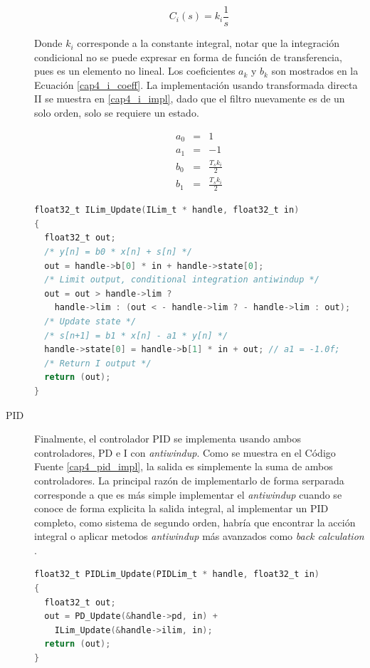 \begin{description}
\begin{equation}\label{cap4_i}
C_{i}(s)=k_i \frac{1}{s}
\end{equation}

Donde $k_i$ corresponde a la constante integral, notar que la integración condicional no se puede expresar en forma de función de transferencia, pues es un elemento no lineal. Los coeficientes $a_k$ y $b_k$ son mostrados en la Ecuación \ref{cap4_i_coeff}. La implementación usando transformada directa II se muestra en \ref{cap4_i_impl}, dado que el filtro nuevamente es de un solo orden, solo se requiere un estado.

\begin{eqnarray}\label{cap4_i_coeff}
a_0 &=& 1\\
a_1 &=& -1\\
b_0 &=& \frac{T_s k_i}{2}\\
b_1 &=& \frac{T_s k_i}{2}
\end{eqnarray}

\begin{lstlisting}[language=C,style=csstyle, caption=Implementación \texttt{ILim\_Update}, label=cap4_i_impl]
float32_t ILim_Update(ILim_t * handle, float32_t in)
{
  float32_t out;
  /* y[n] = b0 * x[n] + s[n] */
  out = handle->b[0] * in + handle->state[0];
  /* Limit output, conditional integration antiwindup */
  out = out > handle->lim ?  
    handle->lim : (out < - handle->lim ? - handle->lim : out);
  /* Update state */
  /* s[n+1] = b1 * x[n] - a1 * y[n] */
  handle->state[0] = handle->b[1] * in + out; // a1 = -1.0f;
  /* Return I output */
  return (out);
}
\end{lstlisting}

\item[PID] Finalmente, el controlador PID se implementa usando ambos controladores, PD e I con \textit{antiwindup}. Como se muestra en el Código Fuente \ref{cap4_pid_impl}, la salida es simplemente la suma de ambos controladores. La principal razón de implementarlo de forma serparada corresponde a que es más simple implementar el \textit{antiwindup} cuando se conoce de forma explicita la salida integral, al implementar un PID completo, como sistema de segundo orden, habría que encontrar la acción integral o aplicar metodos \textit{antiwindup} más avanzados como \textit{back calculation} \cite{practical_pid}.

\begin{lstlisting}[language=C,style=csstyle, caption=Implementación \texttt{PIDLim\_Update}, label=cap4_pid_impl]
float32_t PIDLim_Update(PIDLim_t * handle, float32_t in)
{
  float32_t out;
  out = PD_Update(&handle->pd, in) + 
    ILim_Update(&handle->ilim, in);
  return (out);
}
\end{lstlisting}

\end{description}

